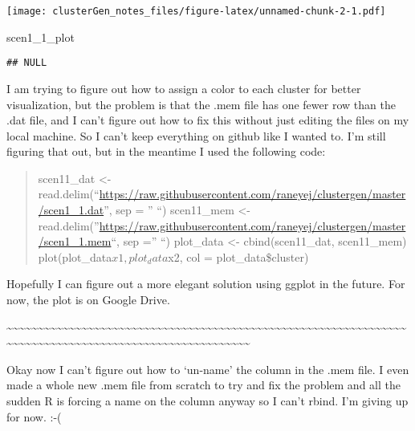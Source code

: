 \documentclass[
]{article}
\newenvironment{Shaded}{\begin{snugshade}}{\end{snugshade}}
\newcommand{\NormalTok}[1]{#1}
\begin{document}
\texttt{[image: clusterGen\_notes\_files/figure-latex/unnamed-chunk-2-1.pdf]}

\begin{Shaded}
\begin{Highlighting}[]
\NormalTok{scen1\_1\_plot}
\end{Highlighting}
\end{Shaded}

\begin{verbatim}
## NULL
\end{verbatim}

I am trying to figure out how to assign a color to each cluster for
better visualization, but the problem is that the .mem file has one
fewer row than the .dat file, and I can't figure out how to fix this
without just editing the files on my local machine. So I can't keep
everything on github like I wanted to. I'm still figuring that out, but
in the meantime I used the following code:

\begin{quote}
scen11\_dat \textless-
read.delim(``\url{https://raw.githubusercontent.com/raneyej/clustergen/master/scen1_1.dat}'',
sep = '' ``) scen11\_mem \textless-
read.delim(''\url{https://raw.githubusercontent.com/raneyej/clustergen/master/scen1_1.mem}``,
sep ='' ``) plot\_data \textless- cbind(scen11\_dat, scen11\_mem)
plot(plot\_data\(x1, plot_data\)x2, col = plot\_data\$cluster)
\end{quote}

Hopefully I can figure out a more elegant solution using ggplot in the
future. For now, the plot is on Google Drive.

\textasciitilde\textasciitilde\textasciitilde\textasciitilde\textasciitilde\textasciitilde\textasciitilde\textasciitilde\textasciitilde\textasciitilde\textasciitilde\textasciitilde\textasciitilde\textasciitilde\textasciitilde\textasciitilde\textasciitilde\textasciitilde\textasciitilde\textasciitilde\textasciitilde\textasciitilde\textasciitilde\textasciitilde\textasciitilde\textasciitilde\textasciitilde\textasciitilde\textasciitilde\textasciitilde\textasciitilde\textasciitilde\textasciitilde\textasciitilde\textasciitilde\textasciitilde\textasciitilde\textasciitilde\textasciitilde\textasciitilde\textasciitilde\textasciitilde\textasciitilde\textasciitilde\textasciitilde\textasciitilde\textasciitilde\textasciitilde\textasciitilde\textasciitilde\textasciitilde\textasciitilde\textasciitilde\textasciitilde\textasciitilde\textasciitilde\textasciitilde\textasciitilde\textasciitilde\textasciitilde\textasciitilde\textasciitilde\textasciitilde\textasciitilde\textasciitilde\textasciitilde\textasciitilde\textasciitilde\textasciitilde\textasciitilde\textasciitilde\textasciitilde\textasciitilde\textasciitilde\textasciitilde\textasciitilde\textasciitilde\textasciitilde\textasciitilde\textasciitilde\textasciitilde\textasciitilde\textasciitilde\textasciitilde\textasciitilde\textasciitilde\textasciitilde\textasciitilde\textasciitilde\textasciitilde\textasciitilde\textasciitilde\textasciitilde\textasciitilde\textasciitilde\textasciitilde\textasciitilde\textasciitilde\textasciitilde\textasciitilde\textasciitilde\textasciitilde\textasciitilde{}

Okay now I can't figure out how to `un-name' the column in the .mem
file. I even made a whole new .mem file from scratch to try and fix the
problem and all the sudden R is forcing a name on the column anyway so I
can't rbind. I'm giving up for now. :-(
\end{document}

